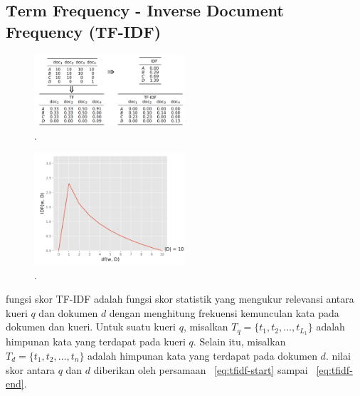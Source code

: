     \subsection{\f{Term Frequency - Inverse Document Frequency} (TF-IDF)}
    \label{sec:tfidf}


    \begin{figure}
        \centering
        \includegraphics[width=0.50\textwidth]{assets/pics/tf-idf-matriks.png}
        \caption{\license.}
        \label{fig:tf-idf-matriks}
    \end{figure}

    \begin{figure}
        \centering
        \includegraphics[width=0.50\textwidth]{assets/pics/idf-graph.png}
        \caption{\license.}
        \label{fig:idf-graph}
    \end{figure}

    fungsi skor TF-IDF adalah fungsi skor statistik yang mengukur relevansi antara kueri $q$ dan dokumen $d$ dengan menghitung frekuensi kemunculan kata pada dokumen dan kueri. Untuk suatu kueri $q$, misalkan $T_q= \{t_1, t_2, \dots, t_{L_1}\}$ adalah himpunan kata yang terdapat pada kueri $q$. Selain itu, misalkan $T_d = \{t_1, t_2, \dots, t_n\}$ adalah himpunan kata yang terdapat pada dokumen $d$. nilai skor antara $q$ dan $d$ diberikan oleh persamaan \equ~\ref{eq:tfidf-start} sampai \equ~\ref{eq:tfidf-end}.

